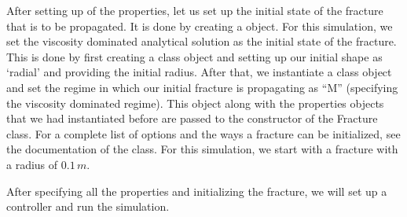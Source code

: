 \documentclass[letterpaper,10pt,english]{sphinxmanual}
\begin{document}
\sphinxAtStartPar
After setting up of the properties, let us set up the initial state of the fracture that is to be propagated. It is done by creating a  object. For this simulation, we set the viscosity dominated analytical solution as the initial state of the fracture. This is done by first creating a  class object and setting up our initial shape as ‘radial’ and providing the initial radius. After that, we instantiate a  class object and set the regime in which our initial fracture is propagating as “M” (specifying the viscosity dominated regime). This object along with the properties objects that we had instantiated before are passed to the constructor of the Fracture class. For a complete list of options and the ways a fracture can be initialized, see the documentation of the  class. For this simulation, we start with a fracture with a radius of \(0.1\,m\).

\begin{sphinxVerbatim}[commandchars=\\\{\}]
   
    

   
   

  
\end{sphinxVerbatim}

\sphinxAtStartPar
After specifying all the properties and initializing the fracture, we will set up a controller and run the simulation.
\end{document}
